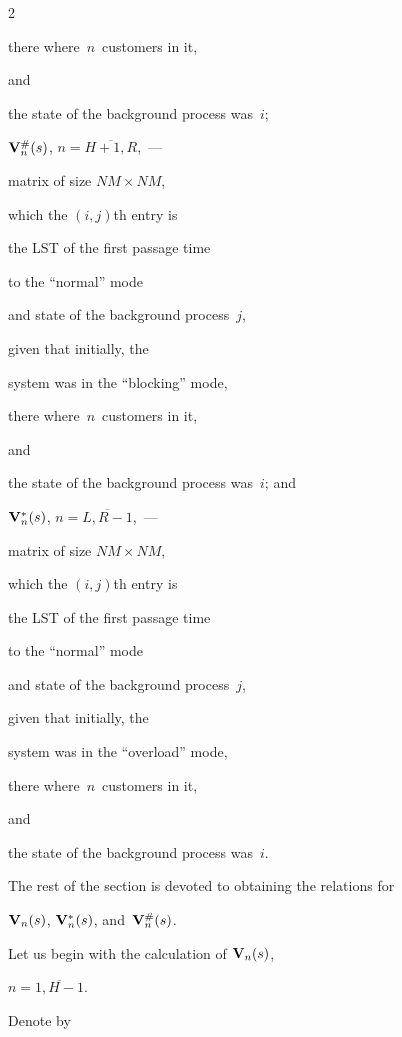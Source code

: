 \begin{multicols}{2}
\begin{description}
there where~$n$~customers in it,


and


the state of the background process was~$i$;


\item[\,] 


$\mathbf{V}^{\#}_n(s)$, $n=\overline{H+1,R}$,~---


matrix of size $NM\times NM$,


which the $(i,j)${th} entry is


the LST of the first passage time 


to the ``normal'' mode 


and state of the background process~$j$, 


given that initially, the 


system was in the ``blocking'' mode,


there where~$n$~customers in it,


and


the state of the background process was~$i$; and


\item[\,] 


$\mathbf{V}^*_n(s)$, $n=\overline{L,R-1}$,~---


matrix of size $NM\times NM$,


which the $(i,j)${th} entry is


the LST of the first passage time 


to the ``normal'' mode 


and state of the background process~$j$, 


given that initially, the 


system was in the ``overload'' mode,


there where~$n$~customers in it,


and


the state of the background process was~$i$.


\end{description}





The rest of the section is devoted to obtaining the relations for


$\mathbf{V}_n(s)$, $\mathbf{V}^*_n(s)$, and~$\mathbf{V}^{\#}_n(s)$.


Let us begin with the calculation of $\mathbf{V}_n(s)$,


$n=\overline{1,H-1}$. 


Denote by 



\end{multicols}
